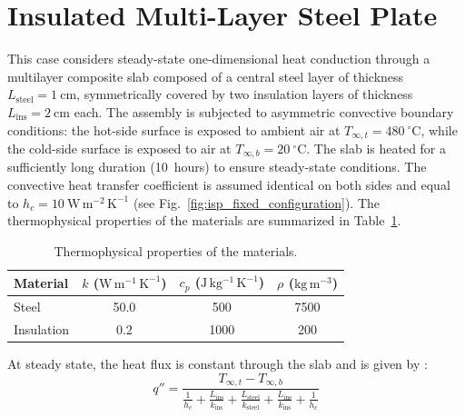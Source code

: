 \documentclass[12pt]{article}
\begin{document}
\fi

\section{Insulated Multi-Layer Steel Plate}

This case considers steady-state one-dimensional heat conduction through a multilayer composite slab composed of a central steel layer of thickness $L_{\text{steel}} = 1~\mathrm{cm}$, symmetrically covered by two insulation layers of thickness $L_{\text{ins}} = 2~\mathrm{cm}$ each. The assembly is subjected to asymmetric convective boundary conditions: the hot-side surface is exposed to ambient air at $T_{\infty,t} = 480~^\circ\mathrm{C}$, while the cold-side surface is exposed to air at $T_{\infty,b} = 20~^\circ\mathrm{C}$. The slab is heated for a sufficiently long duration (10~hours) to ensure steady-state conditions. The convective heat transfer coefficient is assumed identical on both sides and equal to $h_c = 10~\mathrm{W\,m^{-2}\,K^{-1}}$ (see Fig.~\ref{fig:isp_fixed_configuration}). The thermophysical properties of the materials are summarized in Table~\ref{tab:thermal_properties_insulated_steel_plate}.

\begin{table}[H]
\centering
\caption{Thermophysical properties of the materials.}
\label{tab:thermal_properties_insulated_steel_plate}
\renewcommand{\arraystretch}{1.3}
\begin{tabular}{l c c c}
\hline
Material &
$k$ ($\mathrm{W\,m^{-1}\,K^{-1}}$) &
$c_p$ ($\mathrm{J\,kg^{-1}\,K^{-1}}$) &
$\rho$ ($\mathrm{kg\,m^{-3}}$) \\
\hline
Steel        & 50.0 & 500  & 7500 \\
Insulation  & 0.2  & 1000 & 200  \\
\hline
\end{tabular}
\end{table}

At steady state, the heat flux is constant through the slab and is given by \cite{incropera_fundamentals_2007}:
\begin{equation}
q'' =
\frac{T_{\infty,t} - T_{\infty,b}}{
\frac{1}{h_c}
+ \frac{L_{\text{ins}}}{k_{\text{ins}}}
+ \frac{L_{\text{steel}}}{k_{\text{steel}}}
+ \frac{L_{\text{ins}}}{k_{\text{ins}}}
+ \frac{1}{h_c}}
\end{equation}
\end{document}
